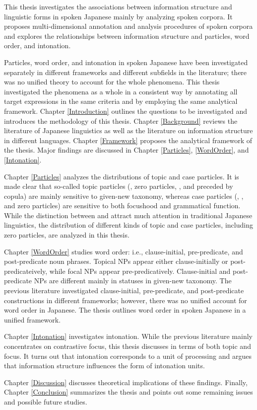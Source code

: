 \label{Abstract}
\begin{refsection}

This thesis investigates the associations between information structure
and linguistic forms in spoken Japanese
mainly by analyzing spoken corpora.
It proposes multi-dimensional annotation and analysis procedures of spoken corpora and
explores the relationships between information structure
and particles, word order, and intonation.

Particles, word order, and intonation in spoken Japanese have been investigated separately in different frameworks and different subfields in the literature;
there was no unified theory to account for the whole phenomena.
This thesis investigated the phenomena as a whole in a consistent way
by annotating all target expressions in the same criteria and
by employing the same analytical framework.
Chapter \ref{Introduction} outlines the questions to be investigated and introduces the methodology of this thesis.
Chapter \ref{Background} reviews the literature of Japanese linguistics
as well as the literature on information structure in different languages.
Chapter \ref{Framework} proposes the analytical framework of the thesis.
Major findings are discussed in Chapter \ref{Particles}, \ref{WordOrder}, and \ref{Intonation}.

Chapter \ref{Particles} analyzes the distributions of topic and case particles.
It is made clear that so-called topic particles 
(, zero particles, , and  preceded by copula) are mainly sensitive to given-new taxonomy,
whereas case particles (, , and zero particles) are sensitive to both focushood and grammatical function.
While the distinction between  and  attract much attention in traditional Japanese linguistics,
the distribution of different kinds of topic and case particles, including zero particles,
are analyzed in this thesis.

Chapter \ref{WordOrder} studies word order:
i.e., clause-initial, pre-predicate, and post-predicate noun phrases.
Topical NPs appear either clause-initially or post-predicateively,
while focal NPs appear pre-predicatively.
Clause-initial and post-predicate NPs are different mainly in statuses in given-new taxonomy.
The previous literature investigated clause-initial, pre-predicate, and post-predicate constructions in different frameworks;
however, there was no unified account for word order in Japanese.
The thesis outlines word order in spoken Japanese in a unified framework.

Chapter \ref{Intonation} investigates intonation.
While the previous literature mainly concentrates on contrastive focus,
this thesis discusses in terms of both topic and focus.
It turns out that intonation corresponds to a unit of processing and
argues that information structure influences the form of intonation units.

Chapter \ref{Discussion} discusses theoretical implications of these findings.
Finally, Chapter \ref{Conclusion} summarizes the thesis
and points out some remaining issues and possible future studies.

\end{refsection}
